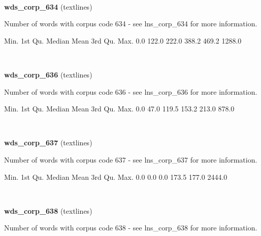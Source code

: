 \documentclass[]{article}
\newenvironment{Shaded}{\begin{snugshade}}{\end{snugshade}}
\newcommand{\FloatTok}[1]{\textcolor[rgb]{0.00,0.00,0.81}{{#1}}}
\newcommand{\NormalTok}[1]{{#1}}
\begin{document}
~

\vspace{1em}

\textbf{wds\_corp\_634} (textlines)

Number of words with corpus code 634 - see lns\_corp\_634 for more
information.

\begin{Shaded}
\begin{Highlighting}[]
   \NormalTok{Min. 1st Qu.  Median    Mean 3rd Qu.    Max. }
    \FloatTok{0.0}   \FloatTok{122.0}   \FloatTok{222.0}   \FloatTok{388.2}   \FloatTok{469.2}  \FloatTok{1288.0} 
\end{Highlighting}
\end{Shaded}

~

\vspace{1em}

\textbf{wds\_corp\_636} (textlines)

Number of words with corpus code 636 - see lns\_corp\_636 for more
information.

\begin{Shaded}
\begin{Highlighting}[]
   \NormalTok{Min. 1st Qu.  Median    Mean 3rd Qu.    Max. }
    \FloatTok{0.0}    \FloatTok{47.0}   \FloatTok{119.5}   \FloatTok{153.2}   \FloatTok{213.0}   \FloatTok{878.0} 
\end{Highlighting}
\end{Shaded}

~

\vspace{1em}

\textbf{wds\_corp\_637} (textlines)

Number of words with corpus code 637 - see lns\_corp\_637 for more
information.

\begin{Shaded}
\begin{Highlighting}[]
   \NormalTok{Min. 1st Qu.  Median    Mean 3rd Qu.    Max. }
    \FloatTok{0.0}     \FloatTok{0.0}     \FloatTok{0.0}   \FloatTok{173.5}   \FloatTok{177.0}  \FloatTok{2444.0} 
\end{Highlighting}
\end{Shaded}

~

\vspace{1em}

\textbf{wds\_corp\_638} (textlines)

Number of words with corpus code 638 - see lns\_corp\_638 for more
information.
\end{document}
